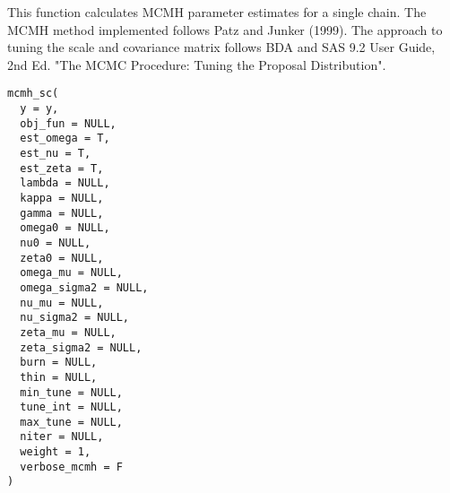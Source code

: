 \documentclass[a4paper]{book}
\begin{document}
%
\begin{Description}\relax
This function calculates MCMH parameter estimates for a single chain. The
MCMH method implemented follows Patz and Junker (1999). The approach to
tuning the scale and covariance matrix follows BDA and SAS 9.2 User Guide,
2nd Ed. "The MCMC Procedure: Tuning the Proposal Distribution".
\end{Description}
%
\begin{Usage}
\begin{verbatim}
mcmh_sc(
  y = y,
  obj_fun = NULL,
  est_omega = T,
  est_nu = T,
  est_zeta = T,
  lambda = NULL,
  kappa = NULL,
  gamma = NULL,
  omega0 = NULL,
  nu0 = NULL,
  zeta0 = NULL,
  omega_mu = NULL,
  omega_sigma2 = NULL,
  nu_mu = NULL,
  nu_sigma2 = NULL,
  zeta_mu = NULL,
  zeta_sigma2 = NULL,
  burn = NULL,
  thin = NULL,
  min_tune = NULL,
  tune_int = NULL,
  max_tune = NULL,
  niter = NULL,
  weight = 1,
  verbose_mcmh = F
)
\end{verbatim}
\end{Usage}
%
\end{document}
